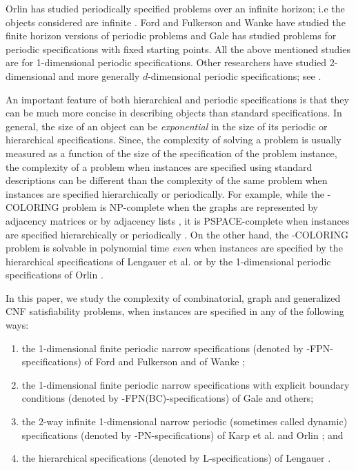Orlin has studied periodically specified problems over an infinite 
horizon; i.e the objects considered are infinite \cite{Or82a}. 
Ford and Fulkerson \cite{FF58} and Wanke \cite{Wa93} have 
studied the finite horizon
versions of periodic problems and Gale \cite{Ga59} has studied problems for
periodic specifications with fixed starting points. All the above mentioned
studies are for 1-dimensional periodic specifications.
Other 
researchers have studied 2-dimensional and more generally $d$-dimensional
periodic specifications; see \cite{CM91,IS87,KO91,KS88,Wa93}. 

An important feature of  both hierarchical and periodic 
specifications is that they
can be much  more concise in describing  objects than standard  specifications.
In general, the size of an object can be \emph{exponential} in the
size of its periodic or hierarchical specifications.
Since, the  complexity of solving a problem 
is usually measured as a function of the size of the specification of the 
problem instance,  
the complexity of a problem when instances are specified using
standard descriptions can
be  different than the complexity of the same problem 
when instances are specified hierarchically or periodically.
For example, while the {-COLORING} problem is 
{\sf NP-}complete when the graphs are represented by adjacency matrices
or by adjacency lists \cite{GJ79}, it is 
{\sf PSPACE}-complete when instances are specified
hierarchically or periodically \cite{LW92,Or84b}.
On the other hand, the {-COLORING} problem is solvable in polynomial time
{\em even} when instances are specified by the hierarchical
specifications of Lengauer et al. \cite{LW92,LW87a} or by  the 
1-dimensional periodic specifications of Orlin \cite{Or82a}.




In this paper, we study the complexity of combinatorial, graph and 
generalized {\sf CNF} satisfiability problems,
when instances are specified in any of the following ways:

\begin{enumerate}
\item
the 1-dimensional finite periodic narrow specifications (denoted by
{-FPN}-specifications) of Ford and Fulkerson \cite{FF58}
and of Wanke \cite{Wa93}; 
\item
the 1-dimensional finite periodic narrow specifications with explicit 
boundary conditions (denoted by {-FPN(BC)}-specifications)
of Gale \cite{Ga59} and others; 
\item
the 2-way infinite 1-dimensional narrow
periodic (sometimes called dynamic) specifications  (denoted by
{-PN}-specifications) 
of Karp et al. and Orlin \cite{KMW67,Or82a}; and 
\item
the hierarchical specifications (denoted by {\sf L}-specifications) of 
Lengauer \cite{LW87a}. 
\end{enumerate}

